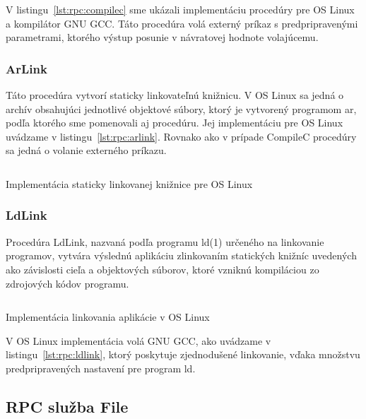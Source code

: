 V listingu~\ref{lst:rpc:compilec} sme ukázali implementáciu procedúry pre OS Linux
a kompilátor GNU GCC\@. Táto procedúra volá externý príkaz s predpripravenými parametrami,
ktorého výstup posunie v návratovej hodnote volajúcemu.

\subsubsection{ArLink}

Táto procedúra vytvorí staticky linkovateľnú knižnicu. V OS Linux sa jedná o archív
obsahujúci jednotlivé objektové súbory, ktorý je vytvorený programom ar, podľa ktorého
sme pomenovali aj procedúru. Jej implementáciu pre OS Linux uvádzame v listingu~\ref{lst:rpc:arlink}.
Rovnako ako v prípade CompileC procedúry sa jedná o volanie externého príkazu.

\begin{listing}[H]
  \inputminted[frame=lines,framesep=2mm,linenos,fontsize=\scriptsize,firstline=49,lastline=72]{go}{/home/pepol/src/imterra/forge/worker/tasks/tasks.go}
  \caption{Implementácia staticky linkovanej knižnice pre OS Linux}
  \label{lst:rpc:arlink}
\end{listing}

\subsubsection{LdLink}

Procedúra LdLink, nazvaná podľa programu ld(1) určeného na linkovanie programov,
vytvára výslednú aplikáciu zlinkovaním statických knižníc uvedených ako závislosti
cieľa a objektových súborov, ktoré vzniknú kompiláciou zo zdrojových kódov programu.

\begin{listing}[H]
  \inputminted[frame=lines,framesep=2mm,linenos,fontsize=\scriptsize,firstline=74,lastline=97]{go}{/home/pepol/src/imterra/forge/worker/tasks/tasks.go}
  \caption{Implementácia linkovania aplikácie v OS Linux}
  \label{lst:rpc:ldlink}
\end{listing}

V OS Linux implementácia volá GNU GCC\@, ako uvádzame v listingu~\ref{lst:rpc:ldlink}, ktorý
poskytuje zjednodušené linkovanie, vďaka množstvu predpripravených nastavení pre program
ld.

\subsection{RPC služba File}
\label{sec:slave:rpc:file}

